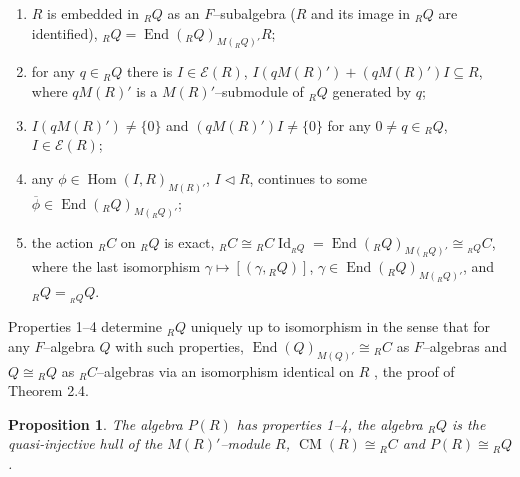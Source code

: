 \documentclass[a4paper,11pt]{article}
\newtheorem{prop}[defi]{Proposition}
\DeclareMathOperator{\Id}{Id}
\DeclareMathOperator{\Hom}{Hom}
\DeclareMathOperator{\End}{End}
\DeclareMathOperator{\CM}{CM}
\begin{document}
\begin{enumerate}

\item $R$ is embedded in ${}_R Q$ as an $F$--subalgebra ($R$ and its image in 
${}_R Q$ are identified), ${{}_R Q=\End({}_R Q)_{M({}_R Q)'} R}$; 

\item for any ${q\in {}_R Q}$ there is ${I\in \mathcal{E}(R)}$, 
${I (q M(R)')+(q M(R)') I\subseteq R}$, where $q M(R)'$ is a 
$M(R)'$--submodule of ${}_R Q$ generated by $q$;

\item ${I (q M(R)')\ne \{0\}}$ and ${(q M(R)') I\ne \{0\}}$ for any 
${0\ne q\in {}_R Q}$, ${I\in \mathcal{E}(R)}$;

\item any ${\phi\in \Hom(I, R)_{M(R)'}}$, ${I\lhd R}$, continues to some 
${\overline{\phi}\in \End({}_R Q)_{M({}_R Q)'}}$;

\item the action ${}_R C$ on ${}_R Q$ is exact, 
${{}_R C\cong {}_R C \Id_{{}_R Q}=\End({}_R Q)_{M({}_R Q)'}\cong 
{}_{{}_R Q} C}$, where the last isomorphism 
${\gamma\longmapsto [(\gamma, {}_R Q)]}$, 
${\gamma\in \End({}_R Q)_{M({}_R Q)'}}$, and ${{}_R Q={}_{{}_R Q} Q}$.

\end{enumerate}
Properties 1--4 determine ${}_R Q$ uniquely up to isomorphism in the sense 
that for any $F$--algebra $Q$ with such properties, 
${\End(Q)_{M(Q)'}\cong {}_R C}$ as $F$--algebras and 
${Q\cong {}_R Q}$ as ${}_R C$--algebras via an isomorphism  
identical on $R$ \cite{Cab3}, the proof of Theorem 2.4. 

\begin{prop}
The algebra $P(R)$ has properties 1--4, the algebra ${}_R Q$ is the 
quasi-injective hull of the $M(R)'$--module $R$, ${\CM(R)\cong {}_R C}$ and 
${P(R)\cong {}_R Q}$.
\end{prop}
\end{document}
